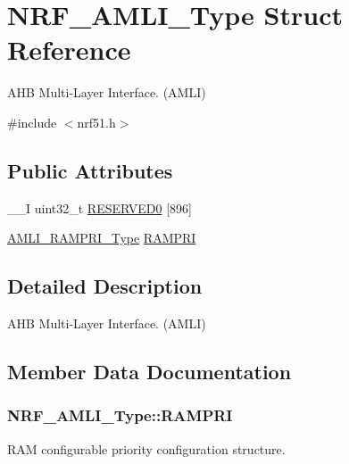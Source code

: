 \hypertarget{struct_n_r_f___a_m_l_i___type}{}\section{N\+R\+F\+\_\+\+A\+M\+L\+I\+\_\+\+Type Struct Reference}
\label{struct_n_r_f___a_m_l_i___type}


A\+H\+B Multi-\/\+Layer Interface. (A\+M\+L\+I)  




{\ttfamily \#include $<$nrf51.\+h$>$}

\subsection*{Public Attributes}
\begin{DoxyCompactItemize}
\item 
\+\_\+\+\_\+\+I uint32\+\_\+t \hyperlink{struct_n_r_f___a_m_l_i___type_a1a10dbade8ef7bb274f1fc952f7b94e6}{R\+E\+S\+E\+R\+V\+E\+D0} \mbox{[}896\mbox{]}
\item 
\hyperlink{struct_a_m_l_i___r_a_m_p_r_i___type}{A\+M\+L\+I\+\_\+\+R\+A\+M\+P\+R\+I\+\_\+\+Type} \hyperlink{struct_n_r_f___a_m_l_i___type_ae71a63730e998884e7d15df8efa1b216}{R\+A\+M\+P\+R\+I}
\end{DoxyCompactItemize}


\subsection{Detailed Description}
A\+H\+B Multi-\/\+Layer Interface. (A\+M\+L\+I) 

\subsection{Member Data Documentation}
\hypertarget{struct_n_r_f___a_m_l_i___type_ae71a63730e998884e7d15df8efa1b216}{}
\subsubsection[{R\+A\+M\+P\+R\+I}]{ N\+R\+F\+\_\+\+A\+M\+L\+I\+\_\+\+Type\+::\+R\+A\+M\+P\+R\+I}\label{struct_n_r_f___a_m_l_i___type_ae71a63730e998884e7d15df8efa1b216}
R\+A\+M configurable priority configuration structure. \hypertarget{struct_n_r_f___a_m_l_i___type_a1a10dbade8ef7bb274f1fc952f7b94e6}{}

